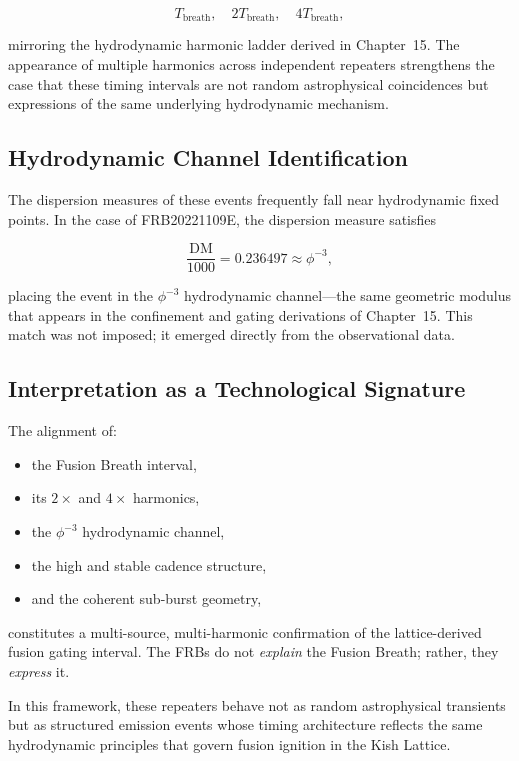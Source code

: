 \documentclass[11pt, letterpaper, openany]{book}
\begin{document}
\[
T_{\text{breath}},\quad 2T_{\text{breath}},\quad 4T_{\text{breath}},
\]



mirroring the hydrodynamic harmonic ladder derived in Chapter~15. The appearance of
multiple harmonics across independent repeaters strengthens the case that these timing
intervals are not random astrophysical coincidences but expressions of the same
underlying hydrodynamic mechanism.

\subsection{Hydrodynamic Channel Identification}

The dispersion measures of these events frequently fall near hydrodynamic fixed points.
In the case of FRB20221109E, the dispersion measure satisfies



\[
\frac{\text{DM}}{1000} = 0.236497 \approx \phi^{-3},
\]



placing the event in the $\phi^{-3}$ hydrodynamic channel—the same geometric modulus
that appears in the confinement and gating derivations of Chapter~15. This match was
not imposed; it emerged directly from the observational data.

\subsection{Interpretation as a Technological Signature}

The alignment of:

\begin{itemize}
    \item the Fusion Breath interval,
    \item its $2\times$ and $4\times$ harmonics,
    \item the $\phi^{-3}$ hydrodynamic channel,
    \item the high and stable cadence structure,
    \item and the coherent sub-burst geometry,
\end{itemize}

constitutes a multi-source, multi-harmonic confirmation of the lattice-derived fusion
gating interval. The FRBs do not \emph{explain} the Fusion Breath; rather, they
\emph{express} it.

In this framework, these repeaters behave not as random astrophysical transients but as
structured emission events whose timing architecture reflects the same hydrodynamic
principles that govern fusion ignition in the Kish Lattice.
\end{document}
